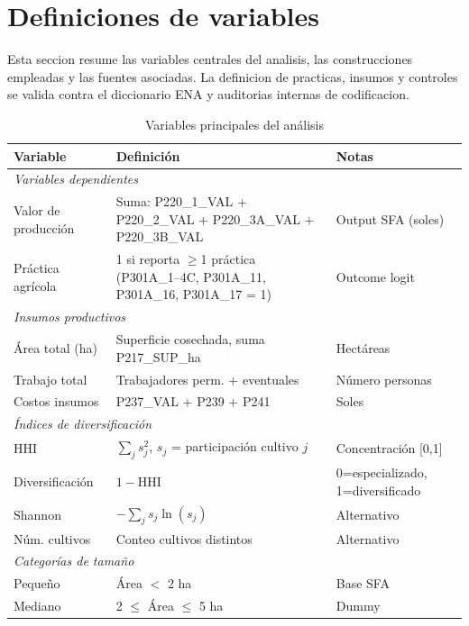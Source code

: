 \documentclass[10pt,a4paper]{article}
\begin{document}
\section{Definiciones de variables}

Esta seccion resume las variables centrales del analisis, las construcciones empleadas y las fuentes asociadas. La definicion de practicas, insumos y controles se valida contra el diccionario ENA y auditorias internas de codificacion.

\begin{table}[H]
\centering
\caption{Variables principales del análisis}
\label{tab:variable_definitions}
\begin{threeparttable}
\small
\begin{tabular}{p{3.2cm}p{6.5cm}p{3.8cm}}
\toprule
\textbf{Variable} & \textbf{Definición} & \textbf{Notas} \\
\midrule
\multicolumn{3}{l}{\textit{Variables dependientes}} \\
Valor de producción & Suma: P220\_1\_VAL + P220\_2\_VAL + P220\_3A\_VAL + P220\_3B\_VAL & Output SFA (soles) \\
Práctica agrícola & 1 si reporta $\geq$1 práctica (P301A\_1--4C, P301A\_11, P301A\_16, P301A\_17 = 1) & Outcome logit \\
\midrule
\multicolumn{3}{l}{\textit{Insumos productivos}} \\
Área total (ha) & Superficie cosechada, suma P217\_SUP\_ha & Hectáreas \\
Trabajo total & Trabajadores perm. + eventuales & Número personas \\
Costos insumos & P237\_VAL + P239 + P241 & Soles \\
\midrule
\multicolumn{3}{l}{\textit{Índices de diversificación}} \\
HHI & $\sum_j s_j^2$, $s_j$ = participación cultivo $j$ & Concentración [0,1] \\
Diversificación & $1 - \text{HHI}$ & 0=especializado, 1=diversificado \\
Shannon & $-\sum_j s_j \ln(s_j)$ & Alternativo \\
Núm. cultivos & Conteo cultivos distintos & Alternativo \\
\midrule
\multicolumn{3}{l}{\textit{Categorías de tamaño}} \\
Pequeño & Área $<$ 2 ha & Base SFA \\
Mediano & 2 $\leq$ Área $\leq$ 5 ha & Dummy \\

\end{tabular}
\end{threeparttable}
\end{table}
\end{document}
